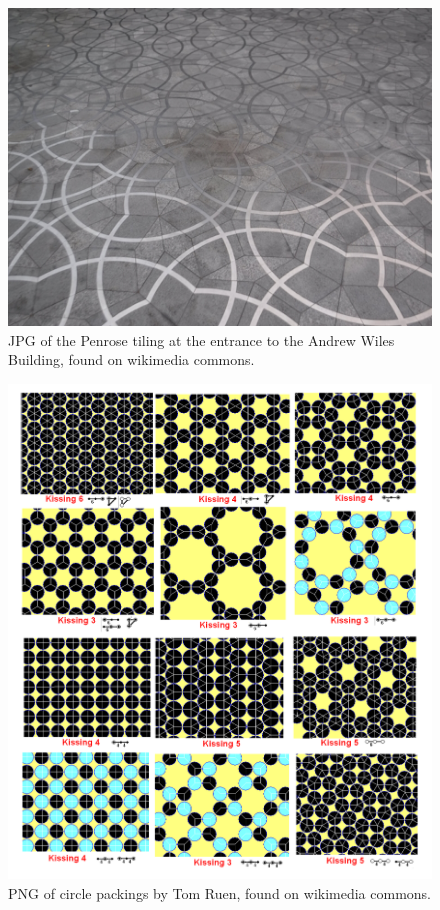 \documentclass{article}
\begin{document}
\begin{figure}
\includegraphics{Penrose_tiling_at_Oxford_Mathematical_Institute_small.jpg}
\caption{JPG of the Penrose tiling at the entrance to the Andrew Wiles Building, found on wikimedia commons.}
\end{figure}
\begin{figure}
\includegraphics{Uniform_tiling_circle_packings.png}
\caption{PNG of circle packings by Tom Ruen, found on wikimedia commons.}
\end{figure}
\end{document}
